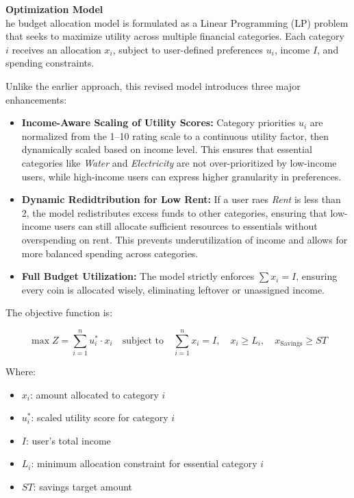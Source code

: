 \documentclass{article}
\begin{document}
\textbf{Optimization Model} \\
he budget allocation model is formulated as a Linear Programming (LP) problem that seeks to maximize utility across multiple financial categories. Each category \(i\) receives an allocation \(x_i\), subject to user-defined preferences \(u_i\), income \(I\), and spending constraints.

Unlike the earlier approach, this revised model introduces three major enhancements:

\begin{itemize}
    \item \textbf{Income-Aware Scaling of Utility Scores:} Category priorities \(u_i\) are normalized from the 1–10 rating scale to a continuous utility factor, then dynamically scaled based on income level. This ensures that essential categories like \textit{Water} and \textit{Electricity} are not over-prioritized by low-income users, while high-income users can express higher granularity in preferences.

    \item \textbf{Dynamic Redidtribution for Low Rent:} If a user raes \textit{Rent}  is less than 2, the model redistributes excess funds to other categories, ensuring that low-income users can still allocate sufficient resources to essentials without overspending on rent. This prevents underutilization of income and allows for more balanced spending across categories.

    \item \textbf{Full Budget Utilization:} The model strictly enforces \(\sum x_i = I\), ensuring every coin is allocated wisely, eliminating leftover or unassigned income.
\end{itemize}

The objective function is:

\[
    \max Z = \sum_{i=1}^{n} u_i^{*} \cdot x_i \quad \text{subject to} \quad \sum_{i=1}^{n} x_i = I, \quad x_i \geq L_i, \quad x_{\text{Savings}} \geq ST
\]

Where:

\begin{itemize}
    \item \(x_i\): amount allocated to category \(i\)
    \item \(u_i^{*}\): scaled utility score for category \(i\)
    \item \(I\): user’s total income
    \item \(L_i\): minimum allocation constraint for essential category \(i\)
    \item \(ST\): savings target amount
\end{itemize}
\end{document}
